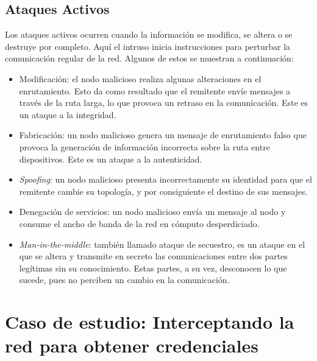\subsection{Ataques Activos}
Los ataques activos ocurren cuando la información se modifica, se altera o 
se destruye por completo. Aquí el intruso inicia instrucciones para 
perturbar la comunicación regular de la red. Algunos de estos se muestran
a continuación:
\begin{itemize}
    \setlength\itemsep{-0.6em}
    \item Modificación: el nodo malicioso realiza algunas alteraciones en el
    enrutamiento. Esto da como resultado que el remitente envíe mensajes a 
    través de la ruta larga, lo que provoca un retraso en la comunicación. 
    Este es un ataque a la integridad.
    \item Fabricación: un nodo malicioso genera un mensaje de enrutamiento 
    falso que provoca la generación de información incorrecta sobre la ruta 
    entre dispositivos. Este es un ataque a la autenticidad.
    \item \emph{Spoofing}: un nodo malicioso presenta incorrectamente su identidad 
    para que el remitente cambie su topología, y por consiguiente el 
    destino de sus mensajes.
    \item Denegación de servicios: un nodo malicioso envía un mensaje al 
    nodo y consume el ancho de banda de la red en cómputo desperdiciado.
    \item \emph{Man-in-the-middle}: también llamado ataque de secuestro, 
    es un ataque en el que se altera y transmite en secreto 
    las comunicaciones entre dos partes legítimas sin su conocimiento. 
    Estas partes, a su vez, desconocen lo que sucede, pues no perciben 
    un cambio en la comunicación.
\end{itemize}


\section[Caso de estudio con Kali Linux]{Caso de estudio: Interceptando la red para obtener credenciales}
\label{secCaseOfStudy}


